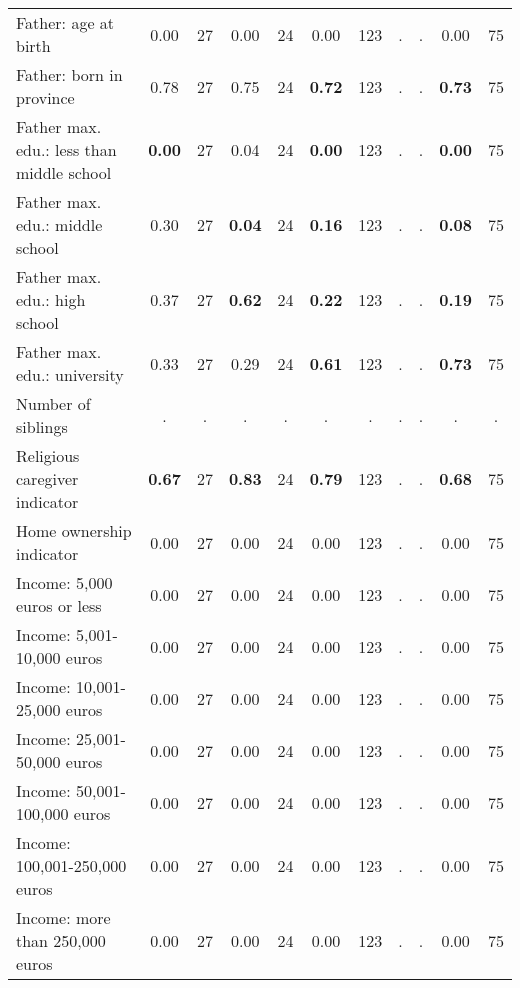 \begin{tabular}{l c c c c c c c c c c}
Father: age at birth &      0.00 &        27 &      0.00 &        24 &      0.00 &       123 &         . & . &      0.00 &        75 \\
Father: born in province &      0.78 &        27 &      0.75 &        24 & \textbf{     0.72} &       123 &         . & . & \textbf{     0.73} &        75 \\
Father max. edu.: less than middle school & \textbf{     0.00} &        27 &      0.04 &        24 & \textbf{     0.00} &       123 &         . & . & \textbf{     0.00} &        75 \\
Father max. edu.: middle school &      0.30 &        27 & \textbf{     0.04} &        24 & \textbf{     0.16} &       123 &         . & . & \textbf{     0.08} &        75 \\
Father max. edu.: high school &      0.37 &        27 & \textbf{     0.62} &        24 & \textbf{     0.22} &       123 &         . & . & \textbf{     0.19} &        75 \\
Father max. edu.: university &      0.33 &        27 &      0.29 &        24 & \textbf{     0.61} &       123 &         . & . & \textbf{     0.73} &        75 \\
Number of siblings &         . & . &         . & . &         . & . &         . & . &         . & . \\
Religious caregiver indicator & \textbf{     0.67} &        27 & \textbf{     0.83} &        24 & \textbf{     0.79} &       123 &         . & . & \textbf{     0.68} &        75 \\
Home ownership indicator &      0.00 &        27 &      0.00 &        24 &      0.00 &       123 &         . & . &      0.00 &        75 \\
Income: 5,000 euros or less &      0.00 &        27 &      0.00 &        24 &      0.00 &       123 &         . & . &      0.00 &        75 \\
Income: 5,001-10,000 euros &      0.00 &        27 &      0.00 &        24 &      0.00 &       123 &         . & . &      0.00 &        75 \\
Income: 10,001-25,000 euros &      0.00 &        27 &      0.00 &        24 &      0.00 &       123 &         . & . &      0.00 &        75 \\
Income: 25,001-50,000 euros &      0.00 &        27 &      0.00 &        24 &      0.00 &       123 &         . & . &      0.00 &        75 \\
Income: 50,001-100,000 euros &      0.00 &        27 &      0.00 &        24 &      0.00 &       123 &         . & . &      0.00 &        75 \\
Income: 100,001-250,000 euros &      0.00 &        27 &      0.00 &        24 &      0.00 &       123 &         . & . &      0.00 &        75 \\
Income: more than 250,000 euros &      0.00 &        27 &      0.00 &        24 &      0.00 &       123 &         . & . &      0.00 &        75 \\
\bottomrule
\end{tabular}
